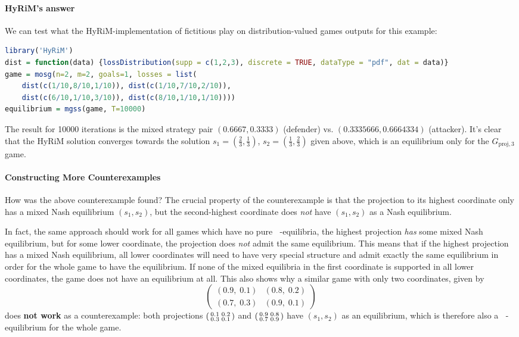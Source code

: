 \documentclass[a4paper]{scrreprt}
\DeclareMathOperator{\leqtail}{\leq_{\text{tail}}}
\begin{document}
    \paragraph{HyRiM's answer}
    We can test what the HyRiM-implementation of fictitious play on distribution-valued games outputs for this example:
    
\begin{lstlisting}[language=R]
library('HyRiM')
dist = function(data) {lossDistribution(supp = c(1,2,3), discrete = TRUE, dataType = "pdf", dat = data)}
game = mosg(n=2, m=2, goals=1, losses = list( 
    dist(c(1/10,8/10,1/10)), dist(c(1/10,7/10,2/10)), 
    dist(c(6/10,1/10,3/10)), dist(c(8/10,1/10,1/10))))
equilibrium = mgss(game, T=10000)
\end{lstlisting}

    The result for 10000 iterations is the mixed strategy pair $(0.6667, 0.3333)$ (defender) vs. $(0.3335666, 0.6664334)$ (attacker).
    It's clear that the HyRiM solution converges towards the solution $s_1 = (\frac{2}{3}, \frac{1}{3})$, $s_2 = (\frac{1}{3}, \frac{2}{3})$ given above, which is an equilibrium only for the $G_{\text{proj},3}$ game.
    
    \paragraph{Constructing More Counterexamples}
    How was the above counterexample found?
    The crucial property of the counterexample is that the projection to its highest coordinate only has a mixed Nash equilibrium $(s_1, s_2)$, but the second-highest coordinate does \emph{not} have $(s_1, s_2)$ as a Nash equilibrium.
    
    In fact, the same approach should work for all games which have no pure $\leqtail$-equilibria, the highest projection \emph{has} some mixed Nash equilibrium, but for some lower coordinate, the projection does \emph{not} admit the same equilibrium. This means that if the highest projection has a mixed Nash equilibrium, all lower coordinates will need to have very special structure and admit exactly the same equilibrium in order for the whole game to have the equilibrium. If none of the mixed equilibria in the first coordinate is supported in all lower coordinates, the game does not have an equilibrium at all. This also shows why a similar game with only two coordinates, given by
    \begin{equation}
        \begin{pmatrix}
            (0.9,\; 0.1) & (0.8,\; 0.2) \\
            (0.7,\; 0.3) & (0.9,\; 0.1)
        \end{pmatrix}
    \end{equation}
    does \textbf{not work} as a counterexample: both projections $\left(\begin{smallmatrix}0.1 & 0.2 \\ 0.3 & 0.1\end{smallmatrix}\right)$ and $\left(\begin{smallmatrix}0.9 & 0.8 \\ 0.7 & 0.9\end{smallmatrix}\right)$ have $(s_1, s_2)$ as an equilibrium, which is therefore also a $\leqtail$-equilibrium for the whole game.
    
\end{document}
